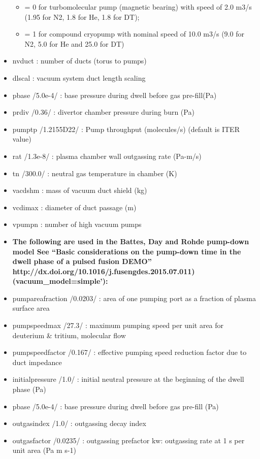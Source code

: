 \documentclass[]{article}
\begin{document}
\begin{itemize}
  \begin{itemize}
  \itemsep1pt\parskip0pt
  \item
    = 0 for turbomolecular pump (magnetic bearing) with speed of 2.0
    m3/s (1.95 for N2, 1.8 for He, 1.8 for DT);
  \item
    = 1 for compound cryopump with nominal speed of 10.0 m3/s (9.0 for
    N2, 5.0 for He and 25.0 for DT)
  \end{itemize}
\item
  nvduct : number of ducts (torus to pumps)
\item
  dlscal : vacuum system duct length scaling
\item
  pbase /5.0e-4/ : base pressure during dwell before gas pre-fill(Pa)
\item
  prdiv /0.36/ : divertor chamber pressure during burn (Pa)
\item
  pumptp /1.2155D22/ : Pump throughput (molecules/s) (default is ITER
  value)
\item
  rat /1.3e-8/ : plasma chamber wall outgassing rate (Pa-m/s)
\item
  tn /300.0/ : neutral gas temperature in chamber (K)
\item
  vacdshm : mass of vacuum duct shield (kg)
\item
  vcdimax : diameter of duct passage (m)
\item
  vpumpn : number of high vacuum pumps
\item
  \textbf{The following are used in the Battes, Day and Rohde pump-down
  model See ``Basic considerations on the pump-down time in the dwell
  phase of a pulsed fusion DEMO''
  http://dx.doi.org/10.1016/j.fusengdes.2015.07.011)
  (vacuum\_model=simple'):}
\item
  pumpareafraction /0.0203/ : area of one pumping port as a fraction of
  plasma surface area
\item
  pumpspeedmax /27.3/ : maximum pumping speed per unit area for
  deuterium \& tritium, molecular flow
\item
  pumpspeedfactor /0.167/ : effective pumping speed reduction factor due
  to duct impedance
\item
  initialpressure /1.0/ : initial neutral pressure at the beginning of
  the dwell phase (Pa)
\item
  pbase /5.0e-4/ : base pressure during dwell before gas pre-fill (Pa)
\item
  outgasindex /1.0/ : outgassing decay index
\item
  outgasfactor /0.0235/ : outgassing prefactor kw: outgassing rate at 1
  s per unit area (Pa m s-1)
\end{itemize}
\end{document}

